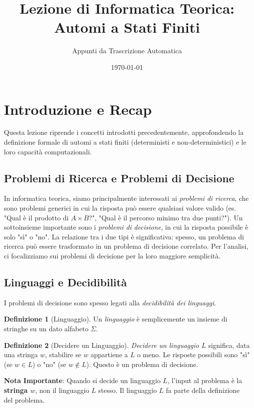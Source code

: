 \documentclass[a4paper]{article}
\title{Lezione di Informatica Teorica: Automi a Stati Finiti}
\author{Appunti da Trascrizione Automatica}
\date{\today}
\theoremstyle{definition} %
\newtheorem{definition}{Definizione}[section]
\begin{document}
\maketitle
\tableofcontents
\newpage

\section{Introduzione e Recap}
Questa lezione riprende i concetti introdotti precedentemente, approfondendo la definizione formale di automi a stati finiti (deterministi e non-deterministici) e le loro capacità computazionali.

\subsection{Problemi di Ricerca e Problemi di Decisione}
In informatica teorica, siamo principalmente interessati ai \emph{problemi di ricerca}, che sono problemi generici in cui la risposta può essere qualsiasi valore valido (es. "Qual è il prodotto di $A \times B$?", "Qual è il percorso minimo tra due punti?").
Un sottoinsieme importante sono i \emph{problemi di decisione}, in cui la risposta possibile è solo "sì" o "no".
La relazione tra i due tipi è significativa: spesso, un problema di ricerca può essere trasformato in un problema di decisione correlato. Per l'analisi, ci focalizziamo sui problemi di decisione per la loro maggiore semplicità.

\subsection{Linguaggi e Decidibilità}
I problemi di decisione sono spesso legati alla \emph{decidibilità dei linguaggi}.
\begin{definition}[Linguaggio]
Un \emph{linguaggio} è semplicemente un insieme di stringhe su un dato alfabeto $\Sigma$.
\end{definition}

\begin{definition}[Decidere un Linguaggio]
\emph{Decidere un linguaggio $L$} significa, data una stringa $w$, stabilire se $w$ appartiene a $L$ o meno. Le risposte possibili sono "sì" (se $w \in L$) o "no" (se $w \notin L$). Questo è un problema di decisione.
\end{definition}

\noindent \textbf{Nota Importante}: Quando si decide un linguaggio $L$, l'input al problema è la \textbf{stringa $w$}, non il linguaggio $L$ stesso. Il linguaggio $L$ fa parte della definizione del problema.
\end{document}
